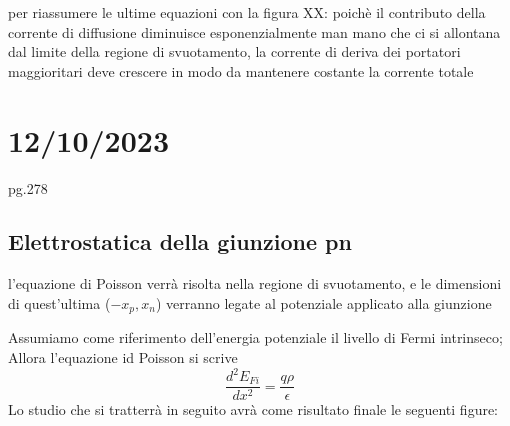 per riassumere le ultime equazioni con la figura XX:
poichè il contributo della corrente di diffusione diminuisce esponenzialmente man mano che ci si allontana dal limite della regione di svuotamento, la corrente di deriva dei portatori maggioritari deve crescere in modo da mantenere costante la corrente totale

\cleardoublepage%

\section*{12/10/2023}

pg.278
\subsection{Elettrostatica della giunzione pn}
\begin{psbox}
    l'equazione di Poisson verrà risolta nella regione di svuotamento, e le dimensioni di quest'ultima ($-x_p, x_n$) verranno legate al potenziale applicato alla giunzione
\end{psbox}
Assumiamo come riferimento dell'energia potenziale il livello di Fermi intrinseco; Allora l'equazione id Poisson si scrive
\begin{equation}
    \dfrac{d^2E_{Fi}}{dx^2}=\dfrac{q\rho}{\epsilon}
\end{equation}
Lo studio che si tratterrà in seguito avrà come risultato finale le seguenti figure:\\
%
